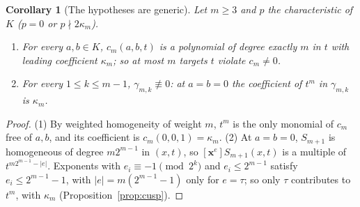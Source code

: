 \documentclass[11pt]{article}
\newtheorem{corollary}[theorem]{Corollary}
\theoremstyle{definition}
\theoremstyle{remark}
\begin{document}
\begin{corollary}[The hypotheses are generic]\label{cor:generic}
Let $m\ge3$ and $p$ the characteristic of $K$ ($p=0$ or $p\nmid2\kappa_m$).
\begin{enumerate}
\item For every $a,b\in K$, $c_m(a,b,t)$ is a polynomial of degree exactly $m$ in
$t$ with leading coefficient $\kappa_m$; so at most $m$ targets $t$ violate
$c_m\ne0$.
\item For every $1\le k\le m-1$, $\gamma_{m,k}\not\equiv0$: at $a=b=0$ the coefficient of
$t^m$ in $\gamma_{m,k}$ is $\kappa_m$.
\end{enumerate}
\end{corollary}
\begin{proof}
(1) By weighted homogeneity of weight $m$, $t^m$ is the only monomial of
$c_m$ free of $a,b$, and its coefficient is $c_m(0,0,1)=\kappa_m$.
(2) At $a=b=0$, $S_{m+1}$ is homogeneous of degree $m2^{m-1}$ in $(x,t)$,
so $[\mathbf x^e]S_{m+1}(x,t)$ is a multiple of $t^{m2^{m-1}-|e|}$. Exponents
with $e_i\equiv-1\pmod{2^k}$ and $e_i\le2^{m-1}$ satisfy $e_i\le2^{m-1}-1$,
with $|e|=m(2^{m-1}-1)$ only for $e=\tau$; so only $\tau$ contributes to
$t^m$, with $\kappa_m$ (Proposition~\ref{prop:cusp}).
\end{proof}
\end{document}
